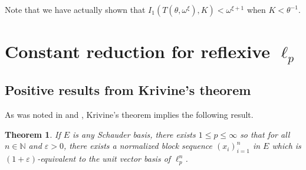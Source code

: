 \documentclass[12pt]{amsart}
\newtheorem{theorem}{Theorem}[section]
\theoremstyle{definition}
\newcommand{\nn}{\mathbb{N}}
\begin{document}
Note that we have actually shown that $I_1(T(\theta, \omega^\xi), K)<\omega^{\xi+1}$ when $K<\theta^{-1}$.  









































































\section{Constant reduction for reflexive $\ell_p$}

\subsection{Positive results from Krivine's theorem}


As was noted in \cite{L} and \cite{Rosenthal Krivine}, Krivine's theorem \cite{K} implies the following result.    

\begin{theorem} If $E$ is any Schauder basis, there exists $1\leqslant p\leqslant \infty$ so that for all $n\in \nn$ and $\varepsilon>0$, there exists a normalized block sequence $(x_i)_{i=1}^n$ in $E$ which is $(1+\varepsilon)$-equivalent to the unit vector basis of $\ell_p^n$.  

\label{Krivine}

\end{theorem}
\end{document}

